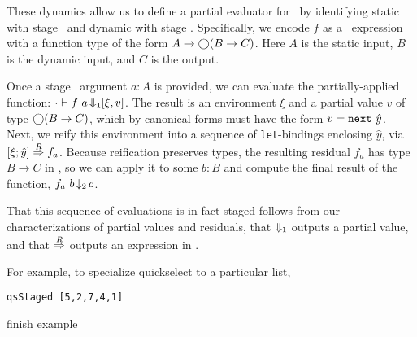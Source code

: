
These dynamics allow us to define a partial evaluator for \lang\ by identifying
static with stage \bbone\ and dynamic with stage \bbtwo.  Specifically, we
encode $f$ as a \lang\ expression with a function type of the form
$A\to\bigcirc(B\to C)$.%
%
Here $A$ is the static input, $B$ is the dynamic input, and $C$ is the output.

Once a stage \bbone\ argument $a:A$ is provided, we can evaluate the partially-applied
function:
$\cdot\vdash f~a \mathop{{\Downarrow_{ 1}}} [\xi,v]$.
The result is an environment $\xi$ and a partial value $v$ of type $\bigcirc(B\to
C)$, which by canonical forms must have the form $v = {\tt next}~\hat y$. 
Next, we reify this environment into a sequence of \verb|let|-bindings
enclosing $\hat y$, via $[{\xi};{\hat y}]\overset{R}\Rightarrow{f_a}$. 
Because reification preserves types, the resulting residual $f_a$ has type $B\to C$ in \langTwo, so we can apply it to some $b:B$
and compute the final result of the function, $f_a~b \mathop{{\downarrow_{ 2}}} c$.

That this sequence of evaluations is in fact staged follows from our
characterizations of partial values and residuals, that ${\Downarrow_{ 1}}$
outputs a partial value, and that $\overset{R}\Rightarrow$ outputs an expression in \langTwo.

For example, to specialize quickselect to a particular list, 
\begin{lstlisting}
qsStaged [5,2,7,4,1]
\end{lstlisting}
\TODO finish example


